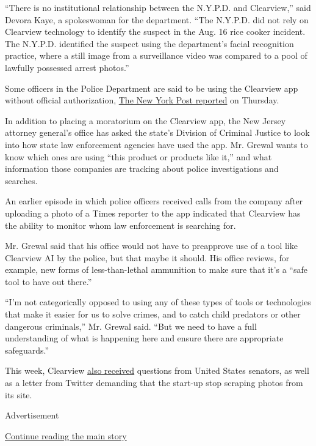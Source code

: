 ``There is no institutional relationship between the N.Y.P.D. and
Clearview,'' said Devora Kaye, a spokeswoman for the department. ``The
N.Y.P.D. did not rely on Clearview technology to identify the suspect in
the Aug. 16 rice cooker incident. The N.Y.P.D. identified the suspect
using the department's facial recognition practice, where a still image
from a surveillance video was compared to a pool of lawfully possessed
arrest photos.''

Some officers in the Police Department are said to be using the
Clearview app without official authorization,
\href{https://nypost.com/2020/01/23/rogue-nypd-cops-are-using-sketchy-facial-recognition-app-clearview/}{The
New York Post reported} on Thursday.

In addition to placing a moratorium on the Clearview app, the New Jersey
attorney general's office has asked the state's Division of Criminal
Justice to look into how state law enforcement agencies have used the
app. Mr. Grewal wants to know which ones are using ``this product or
products like it,'' and what information those companies are tracking
about police investigations and searches.

An earlier episode in which police officers received calls from the
company after uploading a photo of a Times reporter to the app indicated
that Clearview has the ability to monitor whom law enforcement is
searching for.

Mr. Grewal said that his office would not have to preapprove use of a
tool like Clearview AI by the police, but that maybe it should. His
office reviews, for example, new forms of less-than-lethal ammunition to
make sure that it's a ``safe tool to have out there.''

``I'm not categorically opposed to using any of these types of tools or
technologies that make it easier for us to solve crimes, and to catch
child predators or other dangerous criminals,'' Mr. Grewal said. ``But
we need to have a full understanding of what is happening here and
ensure there are appropriate safeguards.''

This week, Clearview
\href{https://www.nytimes3xbfgragh.onion/2020/01/22/technology/clearview-ai-twitter-letter.html}{also
received} questions from United States senators, as well as a letter
from Twitter demanding that the start-up stop scraping photos from its
site.

Advertisement

\protect\hyperlink{after-bottom}{Continue reading the main story}


